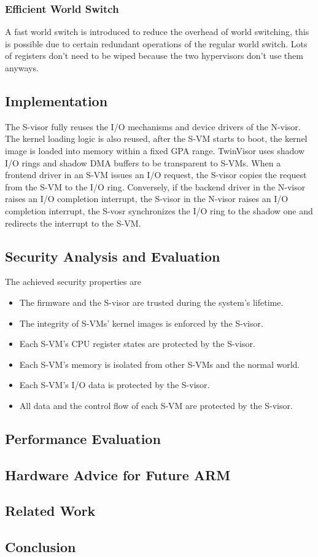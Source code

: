 \documentclass{article}
\begin{document}
\subsubsection{Efficient World Switch}

A fast world switch is introduced to reduce the overhead of world switching, this is possible due to certain redundant operations of the regular world switch. Lots of registers don't need to be wiped because the two hypervisors don't use them anyways.

\subsection{Implementation}

The S-visor fully reuses the I/O mechanisms and device drivers of the N-visor. The kernel loading logic is also reused, after the S-VM starts to boot, the kernel image is loaded into memory within a fixed GPA range. TwinVisor uses shadow I/O rings and shadow DMA buffers to be transparent to S-VMs. When a frontend driver in an S-VM issues an I/O request, the S-visor copies the request from the S-VM to the I/O ring. Conversely, if the backend driver in the N-visor raises an I/O completion interrupt, the S-visor in the N-visor raises an I/O completion interrupt, the S-vosr synchronizes the I/O ring to the shadow one and redirects the interrupt to the S-VM. 

\subsection{Security Analysis and Evaluation}

The achieved security properties are \begin{itemize}
\item The firmware and the S-visor are trusted during the system’s lifetime.
\item The integrity of S-VMs’ kernel images is enforced by the S-visor.
\item Each S-VM’s CPU register states are protected by the S-visor.
\item Each S-VM’s memory is isolated from other S-VMs and the normal world.
\item Each S-VM’s I/O data is protected by the S-visor.
\item All data and the control flow of each S-VM are protected by the S-visor.
\end{itemize}

\subsection{Performance Evaluation}

\subsection{Hardware Advice for Future ARM}

\subsection{Related Work}

\subsection{Conclusion}
\end{document}
